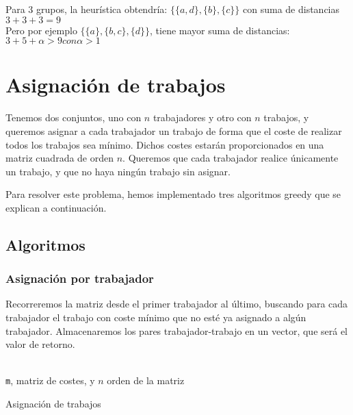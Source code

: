 \documentclass[a4paper, 11pt]{article} %
\begin{document}
    Para 3 grupos, la heurística obtendría: $\{\{a,d\},\{b\},\{c\}\}$ con suma de distancias $3+3+3=9$\\
    
    Pero por ejemplo $\{\{a\},\{b,c\},\{d\}\}$, tiene mayor suma de distancias: $3+5+\alpha>9 con \alpha > 1$

    
\section{Asignación de trabajos}
Tenemos dos conjuntos, uno con $n$ trabajadores y otro con $n$ trabajos, y queremos asignar a cada trabajador un trabajo de forma
que el coste de realizar todos los trabajos sea mínimo. Dichos costes estarán proporcionados en una matriz cuadrada
de orden $n$. Queremos que cada trabajador realice únicamente un trabajo, y que no haya ningún trabajo sin asignar. 

Para resolver este problema, hemos implementado tres algoritmos greedy que se explican a continuación. 
	\subsection{Algoritmos}
		\subsubsection{Asignación por trabajador}
		Recorreremos la matriz desde el primer trabajador al último, buscando para cada trabajador el trabajo con coste mínimo que no esté ya asignado a algún trabajador. Almacenaremos los pares trabajador-trabajo en un vector, que será el valor de retorno. 
		
		\begin{algorithm}[H]
			\begin{algorithmic}[1]
				\REQUIRE \ \\
					\texttt{m}, matriz de costes, y $n$ orden de la matriz\\
		            	\ENDIF
		            \ENDIF
		          \ENDFOR
		        \ENDFOR  	
		        
			\end{algorithmic}
		    \caption{Asignación de trabajos}
		    \label{Asignación Trabajos}
		\end{algorithm}
		
\end{document}

